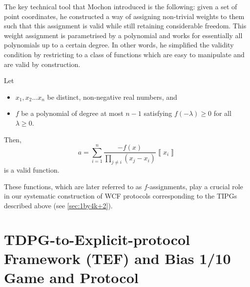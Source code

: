 \documentclass{article}
\begin{document}
The key technical tool that Mochon introduced is the following: given a set
of point coordinates, he constructed a way of assigning non-trivial  weights
to them such that this assignment is valid while still retaining considerable
freedom. This weight assignment is parametrised
by a polynomial and works for essentially all polynomials up to a
certain degree. In other words, he simplified the validity condition
by restricting to a class of functions which are easy to manipulate
and are valid by construction.
\begin{lemma}
  Let \label{lem:fAssignment}
  \begin{itemize}
    \item $x_{1},x_{2}\dots x_{n}$ be distinct, non-negative real numbers, and
    \item $f$ be a polynomial of degree at most $n-1$ satisfying $f(-\lambda)\ge0$
          for all $\lambda\ge0$.
  \end{itemize}
  Then,
  \begin{equation}
    a=\sum_{i=1}^{n}\frac{-f(x)}{\prod_{j\neq i}(x_{j}-x_{i})}\left\llbracket x_{i}\right\rrbracket 	\label{eq:fAssignmentInitial}
  \end{equation}
  is a valid function.
\end{lemma}


These functions, which are later referred to as $f$-assignments, play a crucial role in our systematic construction of WCF protocols corresponding to the TIPGs described above (see \cref{sec:1by4k+2}).

%



%
%
%
%
\section{TDPG-to-Explicit-protocol Framework (TEF) and Bias 1/10 Game and  Protocol\label{sec:TEF}}

%
%
%
%
%
%
%
\end{document}

